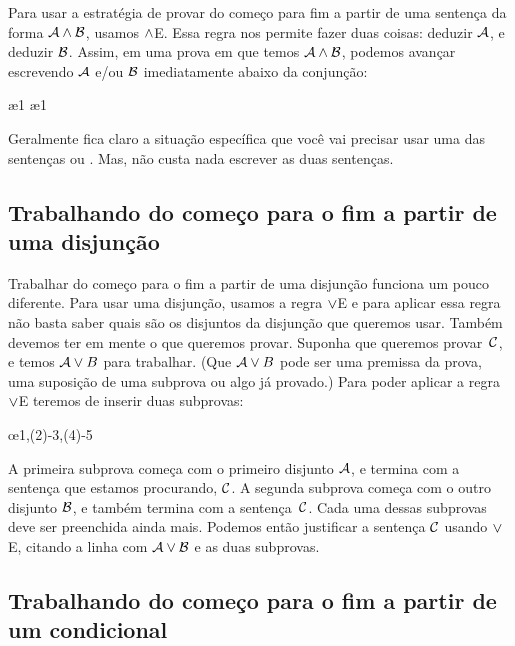 Para usar a estrat\'egia de provar do  come\c co para fim a partir de uma senten\c ca da forma $\mathcal{A} \wedge \mathcal{B}$, usamos $\wedge$E. Essa regra nos permite fazer duas coisas: deduzir $\mathcal{A}$, e deduzir $\mathcal{B}$. Assim, em uma prova em que temos $\mathcal{A} \wedge \mathcal{B}$, podemos avan\c car escrevendo $\mathcal{A}$ e/ou $\mathcal{B}$  imediatamente abaixo da conjun\c c\~ao:

\begin{fitchproof}
  \ae{1}
  \ae{1}
\end{fitchproof}
Geralmente fica claro a situa\c c\~ao espec\'ifica que voc\^e vai  precisar usar uma das senten\c cas  ou .  Mas, n\~ao custa nada escrever as  duas senten\c cas. 

\subsection*{Trabalhando do come\c co para o fim a partir de uma disjun\c c\~ao}

Trabalhar do come\c co para o fim a partir de uma disjun\c c\~ao funciona um pouco diferente. Para usar uma disjun\c c\~ao, usamos a regra $\vee$E e para aplicar essa regra n\~ao basta saber quais s\~ao os disjuntos da disjun\c c\~ao que queremos usar. Tamb\'em devemos ter em mente o que queremos provar. Suponha que queremos provar~$\mathcal{C}$,  e temos $\mathcal{A} \vee B$ para trabalhar. (Que $\mathcal{A} \vee B$ pode ser uma premissa da prova, uma suposi\c c\~ao de uma subprova ou algo j\'a provado.) Para poder aplicar a regra $\vee$E teremos de inserir duas subprovas:
 

\begin{fitchproof}
	\open
	\ellipsesline 
	\close 
	\open
	\ellipsesline
	\close
	\oe{1,(2)-3,(4)-5} 
\end{fitchproof} 
A primeira subprova come\c ca com o primeiro disjunto $\mathcal{A}$, e termina com a senten\c ca que estamos procurando, $\mathcal{C}$. A segunda subprova come\c ca com o outro disjunto $\mathcal{B}$, e tamb\'em termina com  a senten\c ca~$\mathcal{C}$. Cada uma dessas subprovas deve ser preenchida ainda mais. Podemos ent\~ao justificar a senten\c ca $\mathcal{C}$ usando $\vee$E, citando a linha com $\mathcal{A} \vee \mathcal{B}$ e as duas subprovas.

\subsection*{ Trabalhando do come\c co para o fim a partir de um condicional}

